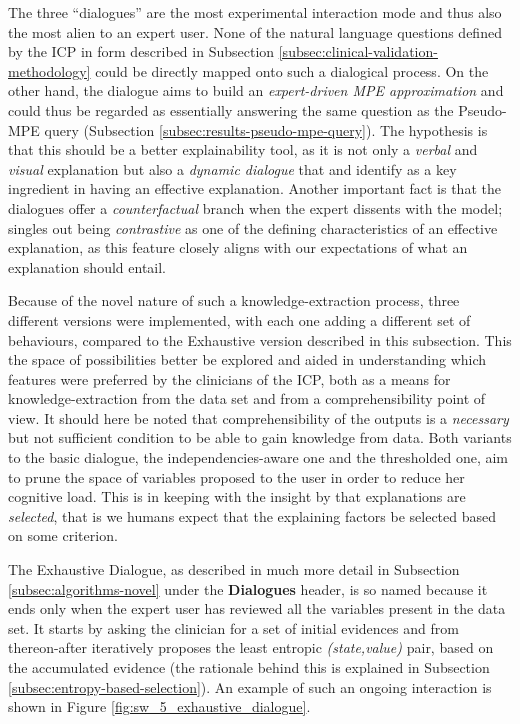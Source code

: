 The three \enquote{dialogues} are the most experimental interaction mode and thus also the most alien to an expert user.
None of the natural language questions defined by the ICP in form described in Subsection \ref{subsec:clinical-validation-methodology} could be directly mapped onto such a dialogical process.
On the other hand, the dialogue aims to build an \textit{expert-driven MPE approximation} and could thus be regarded as essentially answering the same question as the Pseudo-MPE query (Subsection \ref{subsec:results-pseudo-mpe-query}).
The hypothesis is that this should be a better explainability tool, as it is not only a \textit{verbal} and \textit{visual} explanation but also a \textit{dynamic dialogue} that \citet{Hilton1990} and \citet{lacave2002review} identify as a key ingredient in having an effective explanation.
Another important fact is that the dialogues offer a \textit{counterfactual} branch when the expert dissents with the model; \citet{miller2018explanation} singles out being \textit{contrastive} as one of the defining characteristics of an effective explanation, as this feature closely aligns with our expectations of what an explanation should entail.

Because of the novel nature of such a knowledge-extraction process, three different versions were implemented, with each one adding a different set of behaviours, compared to the Exhaustive version described in this subsection.
This the space of possibilities better be explored and aided in understanding which features were preferred by the clinicians of the ICP, both as a means for knowledge-extraction from the data set and from a comprehensibility point of view.
It should here be noted that comprehensibility of the outputs is a \textit{necessary} but not sufficient condition to be able to gain knowledge from data.
Both variants to the basic dialogue, the independencies-aware one and the thresholded one, aim to prune the space of variables proposed to the user in order to reduce her cognitive load.
This is in keeping with the insight by \citet{miller2018explanation} that explanations are \textit{selected}, that is we humans expect that the explaining factors be selected based on some criterion.

The Exhaustive Dialogue, as described in much more detail in Subsection \ref{subsec:algorithms-novel} under the \textbf{Dialogues} header, is so named because it ends only when the expert user has reviewed all the variables present in the data set.
It starts by asking the clinician for a set of initial evidences and from thereon-after iteratively proposes the least entropic \textit{(state,value)} pair, based on the accumulated evidence (the rationale behind this is explained in Subsection \ref{subsec:entropy-based-selection}).
An example of such an ongoing interaction is shown in Figure \ref{fig:sw_5_exhaustive_dialogue}.

